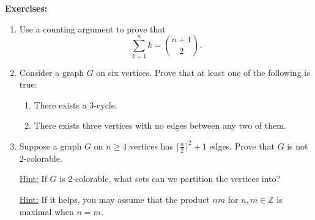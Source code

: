 \documentclass[12pt,letterpaper]{article}
\newcommand\Z{\mathbb Z}
\begin{document}
\textbf{Exercises:}
\begin{enumerate}

\item Use a counting argument to prove that
\[
\sum_{k=1}^{n}k =\binom{n+1}{2}.
\]
\begin{mdframed}\vspace{3 cm}\end{mdframed}
     
\item Consider a graph $G$ on six vertices. Prove that at least one of the following is true:
\begin{enumerate}
\item There exists a 3-cycle.
\item There exists three vertices with no edges between any two of them.

\end{enumerate}
\begin{mdframed}\vspace{3 cm}\end{mdframed}

\item Suppose a graph $G$ on $n \geq 4$ vertices has $\lceil\frac{n}{2}\rceil^2 + 1$ edges. Prove that $G$ is not 2-colorable.

\underline{Hint:} If $G$ is 2-colorable, what sets can we partition the vertices into?

\underline{Hint:} If it helps, you may assume that the product $nm$ for $n,m \in \Z$ is maximal when $n = m$.

\begin{mdframed}\vspace{3 cm}\end{mdframed}

\end{enumerate}
\end{document}
